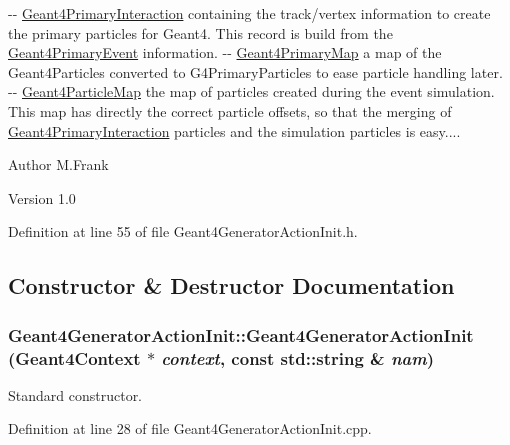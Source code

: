 -\/-\/ \hyperlink{class_d_d4hep_1_1_simulation_1_1_geant4_primary_interaction}{Geant4PrimaryInteraction} containing the track/vertex information to create the primary particles for Geant4. This record is build from the \hyperlink{class_d_d4hep_1_1_simulation_1_1_geant4_primary_event}{Geant4PrimaryEvent} information. -\/-\/ \hyperlink{class_d_d4hep_1_1_simulation_1_1_geant4_primary_map}{Geant4PrimaryMap} a map of the Geant4Particles converted to G4PrimaryParticles to ease particle handling later. -\/-\/ \hyperlink{class_d_d4hep_1_1_simulation_1_1_geant4_particle_map}{Geant4ParticleMap} the map of particles created during the event simulation. This map has directly the correct particle offsets, so that the merging of \hyperlink{class_d_d4hep_1_1_simulation_1_1_geant4_primary_interaction}{Geant4PrimaryInteraction} particles and the simulation particles is easy....

\begin{DoxyAuthor}{Author}
M.Frank 
\end{DoxyAuthor}
\begin{DoxyVersion}{Version}
1.0 
\end{DoxyVersion}


Definition at line 55 of file Geant4GeneratorActionInit.h.

\subsection{Constructor \& Destructor Documentation}
\hypertarget{class_d_d4hep_1_1_simulation_1_1_geant4_generator_action_init_a33f6258e3b8c24b7ccc09ee2a107e6d7}{
\subsubsection[{Geant4GeneratorActionInit}]{\setlength{\rightskip}{0pt plus 5cm}Geant4GeneratorActionInit::Geant4GeneratorActionInit ({\bf Geant4Context} $\ast$ {\em context}, \/  const std::string \& {\em nam})}}
\label{class_d_d4hep_1_1_simulation_1_1_geant4_generator_action_init_a33f6258e3b8c24b7ccc09ee2a107e6d7}


Standard constructor. 

Definition at line 28 of file Geant4GeneratorActionInit.cpp.

